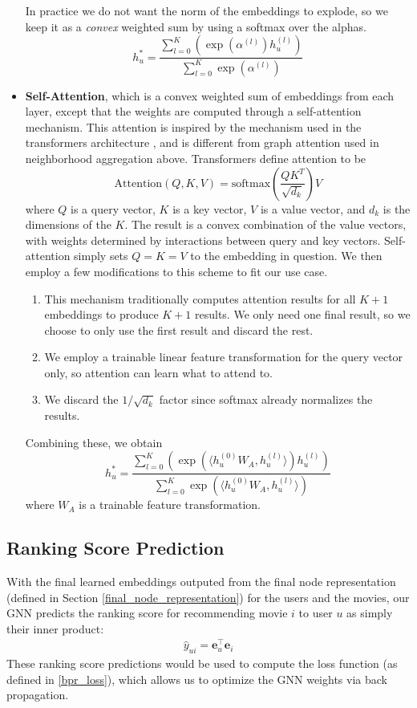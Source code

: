 \documentclass{article}
\begin{document}
\begin{itemize}
    In practice we do not want the norm of the embeddings to explode, so we keep it as a \textit{convex} weighted sum by using a softmax over the alphas.
    $$h_u^*=\frac{\sum_{l=0}^K (\exp(\alpha^{(l)})h_u^{(l)})}{\sum_{l=0}^K \exp(\alpha^{(l)})}$$
    \item \textbf{Self-Attention}, which is a convex weighted sum of embeddings from each layer, except that the weights are computed through a self-attention mechanism. This attention is inspired by the mechanism used in the transformers architecture \cite{transformer}, and is different from graph attention used in neighborhood aggregation above. Transformers define attention to be
    $$\text{Attention}(Q,K,V)=\text{softmax}(\frac{QK^T}{\sqrt{d_k}})V$$
    where $Q$ is a query vector, $K$ is a key vector, $V$ is a value vector, and $d_k$ is the dimensions of the $K$. The result is a convex combination of the value vectors, with weights determined by interactions between query and key vectors. Self-attention simply sets $Q=K=V$ to the embedding in question. We then employ a few modifications to this scheme to fit our use case.
    \begin{enumerate}
        \item This mechanism traditionally computes attention results for all $K+1$ embeddings to produce $K+1$ results. We only need one final result, so we choose to only use the first result and discard the rest.
        \item We employ a trainable linear feature transformation for the query vector only, so attention can learn what to attend to.
        \item We discard the $1/\sqrt{d_k}$ factor since softmax already normalizes the results.
    \end{enumerate}
    Combining these, we obtain
    $$h_u^*=\frac{\sum_{l=0}^K (\exp(\langle h_u^{(0)}W_A, h_u^{(l)}\rangle)h_u^{(l)})}{\sum_{l=0}^K \exp(\langle h_u^{(0)}W_A, h_u^{(l)}\rangle)}$$
    where $W_A$ is a trainable feature transformation.
\end{itemize}

\subsection{Ranking Score Prediction}

With the final learned embeddings outputed from the final node representation (defined in Section \ref{final_node_representation}) for the users and the movies, our GNN predicts the ranking score for recommending movie $i$ to user $u$ as simply their inner product:
\begin{align*}
    \hat{y}_{ui} = \mathbf{e}_u^\top \mathbf{e}_i
\end{align*}
These ranking score predictions would be used to compute the loss function (as defined in \ref{bpr_loss}), which allows us to optimize the GNN weights via back propagation.
\end{document}
